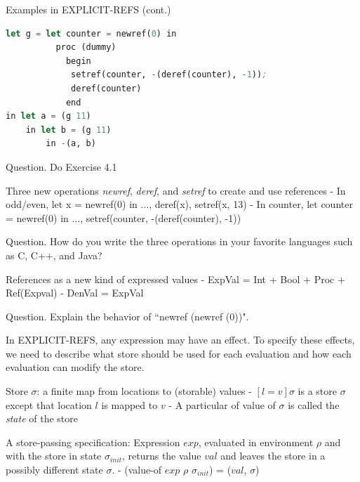 \documentclass{article}
\begin{document}
\begin{huge}

\blob Examples in EXPLICIT-REFS (cont.)

\begin{lstlisting}[language=Lisp]
let g = let counter = newref(0) in  
          proc (dummy) 
            begin
             setref(counter, -(deref(counter), -1));
             deref(counter)
            end
in let a = (g 11)
    in let b = (g 11)
        in -(a, b)
\end{lstlisting}

Question. Do Exercise 4.1


Three new operations {\it newref}, {\it deref}, and {\it setref} to create and use references \al
- In odd/even, let x = newref(0) in ...,  deref(x), setref(x, 13) \al
- In counter, let counter = newref(0) in ..., setref(counter, -(deref(counter), -1))  

Question. How do you write the three operations in your favorite languages such as C, C++, and Java?

References as a new kind of expressed values \al
- ExpVal = Int + Bool + Proc + Ref(Expval) \al
- DenVal = ExpVal

Question. Explain the behavior of ``newref (newref (0))".


In EXPLICIT-REFS, any expression may have an effect. To specify these effects, we need to describe what store should be used for
each evaluation and how each evaluation can modify the store.

Store $\sigma$: a finite map from locations to (storable) values \al
- $[l=v]\sigma$ is a store $\sigma$ except  that location $l$ is mapped to $v$ \al
- A particular of value of $\sigma$ is called the {\it state} of the store

A store-passing specification: 
Expression $exp$, evaluated in environment $\rho$ and with the store in state $\sigma_{init}$, 
returns the value $val$ and leaves the store in a possibly different state $\sigma$. \al
- (value-of $exp$ $\rho$ $\sigma_{init}$) = ($val$, $\sigma$)



\end{huge}
\end{document}

